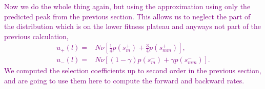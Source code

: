 \documentclass[10pt,a4paper]{article}
\begin{document}
{\vspace{3cm}
\textcolor{purple}{Now we do the whole thing again, but using the approximation using only the predicted peak from the previous section. This allows us to neglect the part of the distribution which is on the lower fitness plateau and anyways not part of the previous calculation,
\begin{align}
u_+(l)=&N\nu \left[ \frac{1}{4} p\left(s^+_m \right) + \frac{3}{4} p\left(s^+_{mm} \right) \right], \label{equ:up_rate2}\\
u_-(l)=&N\nu\left[(1-\gamma) p\left(s^-_m \right) + \gamma p\left(s^-_{mm}\right)\right].\label{equ:down_rate2}
\end{align}
We computed the selection coefficients up to second order in the previous section, and are going to use them here to compute the forward and backward rates.
}
}
\end{document}
